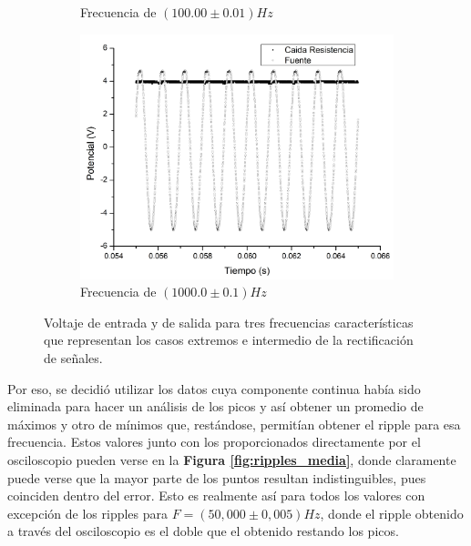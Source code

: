\documentclass[11pt,a4paper]{article}
\begin{document}
\begin{figure}[h]
\begin{subfigure}{0.33\textwidth}
  \caption{Frecuencia de $(100.00\pm0.01)Hz$}
  \label{subfig:rec_100}
\end{subfigure}
\begin{subfigure}{0.33\textwidth}
\includegraphics[scale=0.23]{Rectificacion_1000hz}
  \caption{Frecuencia de $(1000.0\pm0.1)Hz$}
  \label{subfig:rec_1000}
\end{subfigure}
  \caption{Voltaje de entrada y de salida para tres frecuencias características que representan los casos extremos e intermedio de la rectificación de señales. }
  \label{fig:rectificaciones}
\end{figure}

\newpage
Por eso, se decidió utilizar los datos cuya componente continua había sido eliminada para hacer un análisis de los picos y así obtener un promedio de máximos y otro de mínimos que, restándose, permitían obtener el ripple para esa frecuencia. Estos valores junto con los proporcionados directamente por el osciloscopio pueden verse en la \textbf{Figura \ref{fig:ripples_media}}, donde claramente puede verse que la mayor parte de los puntos resultan indistinguibles, pues coinciden dentro del error. Esto es realmente así para todos los valores con excepción de los ripples para $F = (50,000 \pm 0,005)Hz$, donde el ripple obtenido a través del osciloscopio es el doble que el obtenido restando los picos. 
\end{document}
